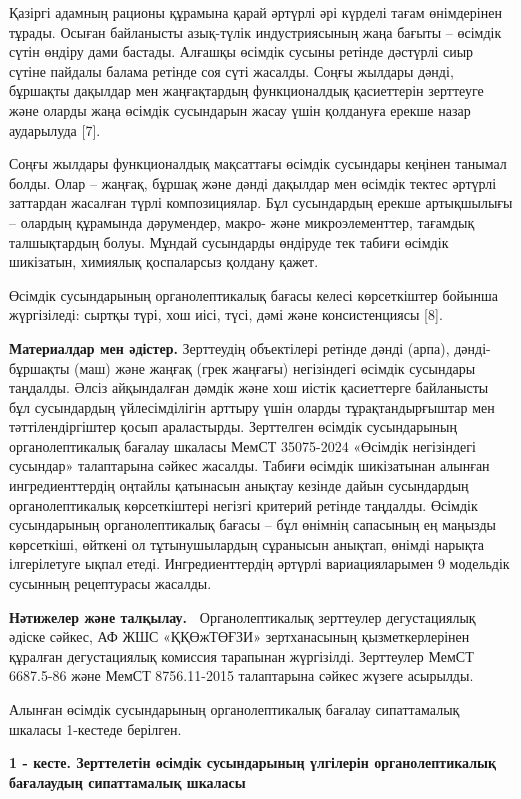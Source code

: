 {Қазіргі адамның рационы құрамына қарай әртүрлі әрі күрделі тағам
өнімдерінен тұрады. Осыған байланысты азық-түлік индустриясының жаңа
бағыты -- өсімдік сүтін өндіру дами бастады. Алғашқы өсімдік сусыны
ретінде дәстүрлі сиыр сүтіне пайдалы балама ретінде соя сүті жасалды.
Соңғы жылдары дәнді, бұршақты дақылдар мен жаңғақтардың функционалдық
қасиеттерін зерттеуге және оларды жаңа өсімдік сусындарын жасау үшін
қолдануға ерекше назар аударылуда {[}7{]}.

Соңғы жылдары функционалдық мақсаттағы өсімдік сусындары кеңінен танымал
болды. Олар -- жаңғақ, бұршақ және дәнді дақылдар мен өсімдік тектес
әртүрлі заттардан жасалған түрлі композициялар. Бұл сусындардың ерекше
артықшылығы -- олардың құрамында дәрумендер, макро- және
микроэлементтер, тағамдық талшықтардың болуы. Мұндай сусындарды өндіруде
тек табиғи өсімдік шикізатын, химиялық қоспаларсыз қолдану қажет.

Өсімдік сусындарының органолептикалық бағасы келесі көрсеткіштер бойынша
жүргізіледі: сыртқы түрі, хош иісі, түсі, дәмі және консистенциясы
{[}8{]}.

{\bfseries Материалдар мен әдістер.} Зерттеудің объектілері ретінде дәнді
(арпа), дәнді-бұршақты (маш) және жаңғақ (грек жаңғағы) негізіндегі
өсімдік сусындары таңдалды. Әлсіз айқындалған дәмдік және хош иістік
қасиеттерге байланысты бұл сусындардың үйлесімділігін арттыру үшін
оларды тұрақтандырғыштар мен тәттілендіргіштер қосып араластырды.
Зерттелген өсімдік сусындарының органолептикалық бағалау шкаласы МемСТ
35075-2024 «Өсімдік негізіндегі сусындар» талаптарына сәйкес жасалды.
Табиғи өсімдік шикізатынан алынған ингредиенттердің оңтайлы қатынасын
анықтау кезінде дайын сусындардың органолептикалық көрсеткіштері негізгі
критерий ретінде таңдалды. Өсімдік сусындарының органолептикалық бағасы
-- бұл өнімнің сапасының ең маңызды көрсеткіші, өйткені ол
тұтынушылардың сұранысын анықтап, өнімді нарықта ілгерілетуге ықпал
етеді. Ингредиенттердің әртүрлі вариацияларымен 9 модельдік сусынның
рецептурасы жасалды.

{\bfseries Нәтижелер және талқылау.~} Органолептикалық зерттеулер
дегустациялық әдіске сәйкес, АФ ЖШС «ҚҚӨжТӨҒЗИ» зертханасының
қызметкерлерінен құралған дегустациялық комиссия тарапынан жүргізілді.
Зерттеулер МемСТ 6687.5-86 және МемСТ 8756.11-2015 талаптарына сәйкес
жүзеге асырылды.

Алынған өсімдік сусындарының органолептикалық бағалау сипаттамалық
шкаласы 1-кестеде берілген.

{\bfseries 1 - кесте. Зерттелетін өсімдік сусындарының үлгілерін
органолептикалық бағалаудың сипаттамалық шкаласы~}

}
